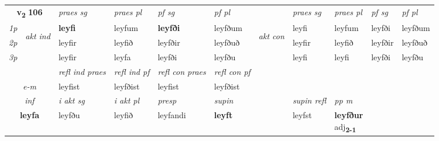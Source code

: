\noindent
\begin{tabular}{lllllllllll} \toprule
\multicolumn{2}{c}{\textbf{v{\textsubscript{2}}} \Large{\textbf{106}}}  &  \textit{praes sg}  & \textit{praes pl}  &\textit{ pf sg} & \textit{pf pl} &  &  \textit{praes sg}  & \textit{praes pl}  & \textit{pf sg} & \textit{pf pl } \\*
	\cmidrule{3-6} \cmidrule{8-11}
 {\textit{1p}} & \multirow{3}{*}{\begin{turn}{90}\textit{akt ind}\end{turn}} & \textbf{leyfi} & leyfum & \textbf{leyfði} & leyfðum & \multirow{3}{*}{\begin{turn}{90}\textit{akt con}\end{turn}} &leyfi & leyfum & leyfði & leyfðum\\*
 {\textit{2p}} &  &  leyfir  & leyfið & leyfðir & leyfðuð & & leyfir & leyfið & leyfðir & leyfðuð \\*
{\textit{3p}} &  & leyfir & leyfa & leyfði & leyfðu & & leyfi & leyfi& leyfði & leyfðu \\*
\cmidrule{3-6} \cmidrule{8-11}

 & & \textit{refl ind praes} & \textit{refl ind pf} & \textit{refl con praes} & \textit{refl con pf} \\*
 \multicolumn{2}{c}{ \textit{e-m} }& leyfist & leyfðist & leyfist & leyfðist \\*

\cmidrule{3-9}
   \multicolumn{2}{c}{\textit{inf}}  & \textit{i akt sg} & \textit{i akt pl}   & \textit{presp} & \textit{supin} && \textit{supin refl} & \textit{pp m} \\*
  \multicolumn{2}{c}{\textbf{leyfa}} & leyfðu  & leyfið   & leyfandi &  \textbf{leyft} && leyfst & \specialcell{\textbf{leyfður} \\ adj\textbf{\textsubscript{2-1}}} \\*
\end{tabular}

